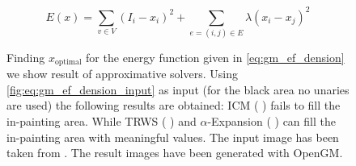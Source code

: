 \begin{equation} \label{eq:gm_ef_dension}
E(x) = \sum_{v \in V}  (I_i - x_i)^2 + \sum_{e=(i,j) \in E } \lambda (x_i-x_j)^2
\end{equation}

\begin{figure}[H]
    \centering
    \caption[Energy based truncated denoising]{
        Finding $x_{\text{optimal}} $ for the energy function given
        in \cref{eq:gm_ef_dension} we show result of approximative solvers.
        Using \cref{fig:eq:gm_ef_dension_input} as input (for the black area no unaries 
        are used)
        the following
        results are obtained:
        ICM
         \citep{besag_1986_icm}  ( ) fails
        to fill the in-painting area. 
        While TRWS
        \citep{kolmogorov_2006_pami_trws}  ( ) 
        and $\alpha$-Expansion
        \citep{boykov_2001_pami}  ( ) 
        can fill the in-painting area
        with meaningful values.
        The input image has been taken from \citep{szeliski_2008_pami}.
        The result images have been generated with OpenGM.
    }\label{fig:gm_ef_denoise}
\end{figure}

